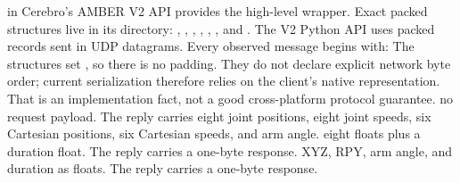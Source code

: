 {}
\markdownRendererSectionEnd \markdownRendererSectionBegin
{}\markdownRendererInterblockSeparator
{}\markdownRendererBlockQuoteBegin
{}  in Cerebro's AMBER V2 API provides the high-level wrapper. Exact packed structures live in its  directory: , , , , , , and .\markdownRendererBlockQuoteEnd \markdownRendererInterblockSeparator
{}The V2 Python API uses packed  records sent in UDP datagrams. Every observed message begins with:\markdownRendererInterblockSeparator
{}\markdownRendererInterblockSeparator
{}The structures set , so there is no padding. They do not declare explicit network byte order; current serialization therefore relies on the client's native representation. That is an implementation fact, not a good cross-platform protocol guarantee.\markdownRendererInterblockSeparator
{}\markdownRendererSectionBegin
{}\markdownRendererInterblockSeparator
{}\markdownRendererUlBegin
\markdownRendererUlItem {} no request payload. The reply carries eight joint positions, eight joint speeds, six Cartesian positions, six Cartesian speeds, and arm angle.\markdownRendererUlItemEnd 
\markdownRendererUlItem {} eight floats plus a duration float. The reply carries a one-byte response.\markdownRendererUlItemEnd 
\markdownRendererUlItem {} XYZ, RPY, arm angle, and duration as floats. The reply carries a one-byte response.\markdownRendererUlItemEnd 
